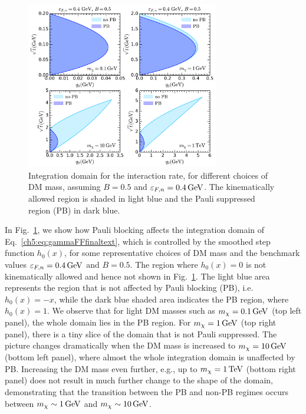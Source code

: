 \begin{figure}[t!bp] 
   \centering
   \includegraphics[width=0.75\textwidth]{capture_3/C_int_domain_mdm.pdf}
   \caption{Integration domain for the interaction rate, for different choices of DM mass, assuming   
     $B=0.5$ and $\varepsilon_{F,n}=0.4{\rm \,GeV}$. The kinematically allowed region is shaded in light blue and the Pauli suppressed region (PB) in dark blue. 
   }
   \label{ch5:fig:intC}
   \end{figure}
   
   
In Fig.~\ref{ch5:fig:intC}, we show how Pauli blocking affects the integration domain of Eq.~\ref{ch5:eq:gammaFFfinaltext}, which is controlled by the smoothed step function $h_0(x)$, for some representative choices of DM mass and the benchmark values $\varepsilon_{F,n}=0.4{\rm \,GeV}$ and $B=0.5$.  The region where $h_0(x)=0$ is not kinematically allowed and hence not shown in Fig.~\ref{ch5:fig:intC}.
The light blue area represents the region that is not affected by Pauli blocking (PB), i.e. $h_0(x)=-x$, while the dark blue shaded area indicates the PB region, where $h_0(x)=1$. 
We observe that for light DM masses such as  $m_\chi=0.1{\rm \,GeV}$ (top left panel), the whole domain lies in the PB region. For $m_\chi=1{\rm \,GeV}$ (top right panel), there is a tiny slice of the domain that is not Pauli suppressed. The picture changes dramatically when the DM mass is increased to $m_\chi=10{\rm \,GeV}$ (bottom left panel), where almost the whole integration domain is unaffected by PB. Increasing the DM mass even further, e.g., up to $m_\chi=1{\rm \,TeV}$ (bottom right panel) does not result in much further change to the shape of the domain, demonstrating that the transition between the PB and non-PB regimes occurs between $m_\chi\sim1{\rm \,GeV}$ and $m_\chi\sim10{\rm \,GeV}$.
   


